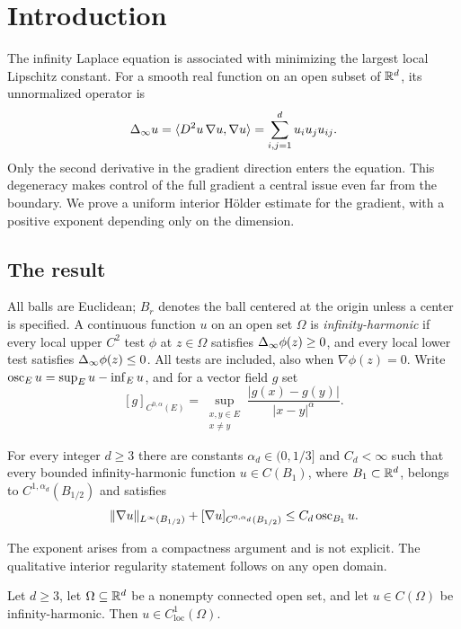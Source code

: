 \section{Introduction}\label{sec:introduction}

The infinity Laplace equation is associated with minimizing the largest
local Lipschitz constant. For a smooth real function on an open subset of
$\mathbb{R}^d$, its unnormalized operator is
\[
 \Delta_{\infty} u=\langle D^2u\,\nabla u,\nabla u\rangle
       =\sum_{i,j=1}^d u_i u_j u_{ij}.
\]
Only the second derivative in the gradient direction enters the equation.
This degeneracy makes control of the full gradient a central issue even
far from the boundary. We prove a uniform interior H\"older estimate for
the gradient, with a positive exponent depending only on the dimension.

\subsection{The result}
All balls are Euclidean; $B_r$ denotes the ball centered at the origin
unless a center is specified. A continuous function $u$ on an open set
$\Omega$ is \emph{infinity-harmonic} if every local upper $C^2$ test $\phi$
at $z\in\Omega$ satisfies $\Delta_{\infty}\phi(z)\ge0$, and every local lower test
satisfies $\Delta_{\infty}\phi(z)\le0$. All tests are included, also when
$\nabla\phi(z)=0$. Write $\operatorname{osc}_Eu=\sup_Eu-\inf_Eu$, and for a vector
field $g$ set
\[
 [g]_{C^{0,\alpha}(E)}
   =\sup_{\substack{x,y\in E\\x\ne y}}
       \frac{|g(x)-g(y)|}{|x-y|^\alpha}.
\]

\begin{theorem}\label{thm:main}
For every integer $d\ge3$ there are constants $\alpha_d\in(0,1/3]$ and
$C_d<\infty$ such that every bounded infinity-harmonic function
$u\in C(B_1)$, where $B_1\subset\mathbb{R}^d$, belongs to
$C^{1,\alpha_d}(B_{1/2})$ and satisfies
\[
 \|\nabla u\|_{L^\infty(B_{1/2})}
       +[\nabla u]_{C^{0,\alpha_d}(B_{1/2})}
       \le C_d\operatorname{osc}_{B_1}u.
\]
\end{theorem}

The exponent arises from a compactness argument and is not explicit.
The qualitative interior regularity statement follows on any open domain.

\begin{corollary}\label{cor:interior-c1}
Let $d\ge3$, let $\Omega\subseteq\mathbb{R}^d$ be a nonempty connected open set,
and let $u\in C(\Omega)$ be infinity-harmonic. Then
$u\in C^1_{\mathrm{loc}}(\Omega)$.
\end{corollary}

